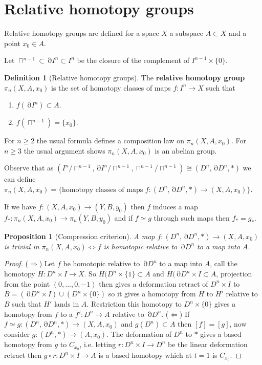 \documentclass[10pt,]{book}
\newcommand{\terminology}[1]{\textbf{#1}}
\theoremstyle{plain}
\newtheorem{proposition}[theorem]{Proposition}
\theoremstyle{definition}
\newtheorem{definition}[theorem]{Definition}
\DeclareMathOperator{\dd}{\partial}
\begin{document}
\section[Relative homotopy groups]{Relative homotopy groups}\label{sec-rel-homotopy}
Relative homotopy groups are defined for a space \(X\) a subspace \(A\subset X\) and a point \(x_0\in A\).%
\par
Let \(\sqcap^{n-1} \subset \dd I^n \subset I^n\) be the closure of the complement of \(I^{n-1}\times\{0\}\).%
\begin{definition}[Relative homotopy groups]\label{definition-2}
The \terminology{relative homotopy group}\(\pi_n(X,A,x_0)\) is the set of homotopy classes of maps \(f\colon I^n\to X\) such that
            \begin{enumerate}
\item{}\(f(\dd I^n)\subset A\).\item{}\(f(\sqcap^{n-1}) = \{x_0\}\).\end{enumerate}

            For \(n\ge 2\) the usual formula defines a composition law on \(\pi_n(X,A,x_0)\).
            For \(n\ge 3\) the usual argument shows \(\pi_n(X,A,x_0)\) is an abelian group.
          \end{definition}
\par
Observe that as \((I^n/\sqcap^{n-1}, \dd I^n/\sqcap^{n-1},\sqcap^{n-1}/\sqcap^{n-1})\cong (D^n,\dd D^n, *)\) we can define \(\pi_n(X,A,x_0) = \{\text{homotopy classes of maps }f\colon (D^n,\dd D^n, *)\to (X,A,x_0)\}\).%
\par
If we have \(f\colon (X,A, x_0) \to (Y,B,y_0)\) then \(f\) induces a map \(f_*\colon \pi_n(X,A,x_0)\to \pi_n(Y,B,y_0)\) and if \(f\simeq g\) through such maps then \(f_* = g_*\).%
\begin{proposition}[Compression criterion]\label{proposition-1}
A map \(f\colon (D^n, \dd D^n, *)\to (X,A, x_0)\) is trivial in \(\pi_n(X,A,x_0)\iff f\) is homotopic relative to \(\dd D^n\) to a map into \(A\).\end{proposition}
\begin{proof}
(\(\Rightarrow\)) Let \(f\) be homotopic relative to \(\dd D^n\) to a map into \(A\), call the homotopy \(H\colon D^n\times I \to X\).
            So \(H(D^n\times \{1\}\subset A\) and \(H(\dd D^n \times I\subset A\), projection from the point \((0,\ldots,0,-1)\) then gives a deformation retract of \(D^n \times I\) to \(B = (\dd D^n \times I)\cup (D^n\times\{0\})\) so it gives a homotopy from \(H\) to \(H'\) relative to \(B\) such that \(H'\) lands in \(A\).
            Restriction this homotopy to \(D^n\times \{0\}\) gives a homotopy from \(f\) to a \(f'\colon D^n \to A\) relative to \(\dd D^n\).
            \newline{}
            (\(\Leftarrow\)) If \(f\simeq g\colon( D^n,\dd D^n, *)\to (X,A,x_0) \) and \(g(D^n)\subset A\) then \([f] = [g]\), now consider \(g\colon (D^n , *) \to (A,x_0)\).
            The deformation of \(D^n\) to \(*\) gives a based homotopy from \(g\) to \(C_{x_0}\), i.e. letting \(r\colon D^n \times I \to D^n\) be the linear deformation retract then \(g\circ r \colon D^n \times I \to A\) is a based homotopy which at \(t = 1\) is \(C_{x_0}\).
\end{proof}
\end{document}
